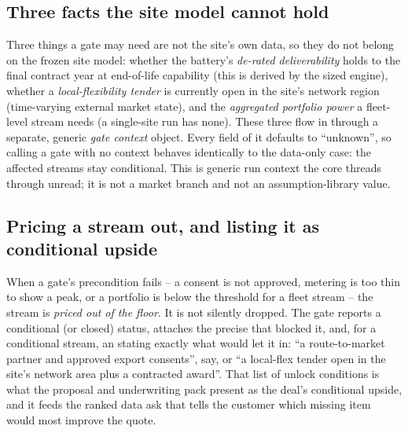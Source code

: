 \subsection{Three facts the site model cannot hold}

Three things a gate may need are not the site's own data, so they do not belong on the frozen site model: whether the battery's \emph{de-rated deliverability} holds to the final contract year at end-of-life capability (this is derived by the sized engine), whether a \emph{local-flexibility tender} is currently open in the site's network region (time-varying external market state), and the \emph{aggregated portfolio power} a fleet-level stream needs (a single-site run has none). These three flow in through a separate, generic \emph{gate context} object. Every field of it defaults to ``unknown'', so calling a gate with no context behaves identically to the data-only case: the affected streams stay conditional. This is generic run context the core threads through unread; it is not a market branch and not an assumption-library value.

\subsection{Pricing a stream out, and listing it as conditional upside}

When a gate's precondition fails -- a consent is not approved, metering is too thin to show a peak, or a portfolio is below the threshold for a fleet stream -- the stream is \emph{priced out of the floor}. It is not silently dropped. The gate reports a conditional (or closed) status, attaches the precise  that blocked it, and, for a conditional stream, an  stating exactly what would let it in: ``a route-to-market partner and approved export consents'', say, or ``a local-flex tender open in the site's network area plus a contracted award''. That list of unlock conditions is what the proposal and underwriting pack present as the deal's conditional upside, and it feeds the ranked data ask that tells the customer which missing item would most improve the quote.


